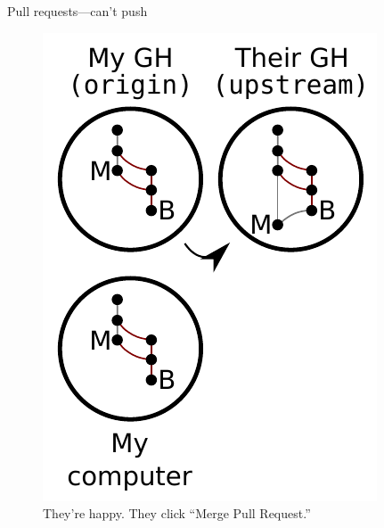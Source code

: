 \begin{frame}{Pull requests---can't push}
  \begin{figure}
    \includegraphics{fork_013.pdf}
    \\ They're happy. They click ``Merge Pull Request.''
  \end{figure}
\end{frame}

